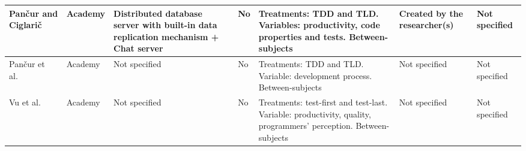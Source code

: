 \begin{tabular}{|p{1.5cm}|p{1.3cm}|p{3.5cm}|p{1.5cm}|p{3.5cm}|p{1.5cm}|p{1.7cm}|}
Pan\v cur and Ciglari\v c~\cite{Pancur2011} & Academy & Distributed database server with built-in data replication mechanism + Chat server & No & Treatments: TDD and TLD. Variables: productivity, code properties and tests. Between-subjects  & Created by the researcher(s) & Not specified \\ \hline
Pan\v cur et al.~\cite{Pancur2003} & Academy & Not specified & No & Treatments: TDD and TLD. Variable: development process. Between-subjects  & Not specified & Not specified \\ \hline
Vu et al.~\cite{Vu2009} & Academy & Not specified & No & Treatments: test-first and test-last. Variable: productivity, quality, programmers' perception. Between-subjects & Not specified & Not specified \\ \hline
\end{tabular}